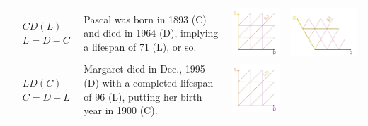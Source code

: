 \documentclass[12pt,oneside,a4paper]{article} %
\begin{document}
\begin{longtable}{m{}m{}m{}m{}}
  $$\begin{aligned}
    &CD(L) \\
    &L = D - C
  \end{aligned}$$ &
  Pascal was born in 1893 (C) and died in 1964 (D), implying a lifespan of 71 (L), or so. &
  \includegraphics[scale=.5]{Figures/DiagramTable/CD_rt.pdf} &
  \includegraphics[scale=.5]{Figures/DiagramTable/CD_iso.pdf}  \\
  $$\begin{aligned}
    &LD(C) \\
    &C = D - L
  \end{aligned}$$ &
  Margaret died in Dec., 1995 (D) with a completed lifespan of 96 (L), putting her birth year in 1900 (C). &
  \includegraphics[scale=.5]{Figures/DiagramTable/LD_rt.pdf} &

\end{longtable}
\end{document}
